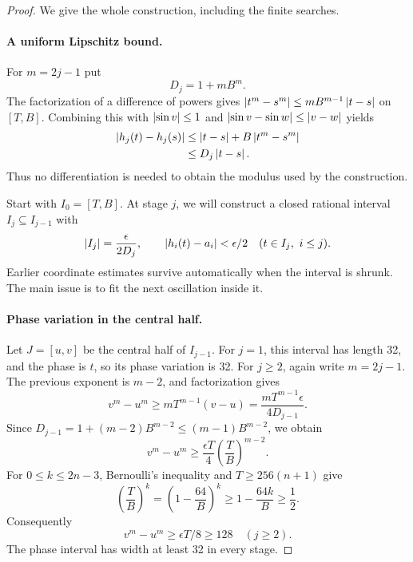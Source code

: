\begin{proof}
We give the whole construction, including the finite searches.

\paragraph{A uniform Lipschitz bound.}
For $m=2j-1$ put
\[
 D_j=1+mB^m.
\]
The factorization of a difference of powers gives
$\left|t^m-s^m\right|\le mB^{m-1}\left|t-s\right|$ on $[T,B]$. Combining this with
$\left|\sin v\right|\le1$ and
$\left|\sin v-\sin w\right|\le\left|v-w\right|$ yields
\begin{align}
 \left|h_j(t)-h_j(s)\right|
 &\le\left|t-s\right|+B\left|t^m-s^m\right|\notag\\
 &\le D_j\left|t-s\right|.\label{eq:density-lipschitz}
\end{align}
Thus no differentiation is needed to obtain the modulus used by the
construction.

Start with $I_0=[T,B]$. At stage $j$, we will construct a closed rational
interval $I_j\subseteq I_{j-1}$ with
\begin{equation}
 \left|I_j\right|=\frac\epsilon{2D_j},
 \qquad
 \left|h_i(t)-a_i\right|<\epsilon/2
 \quad(t\in I_j,\ i\le j).\label{eq:interval-invariant}
\end{equation}
Earlier coordinate estimates survive automatically when the interval is
shrunk. The main issue is to fit the next oscillation inside it.

\paragraph{Phase variation in the central half.}
Let $J=[u,v]$ be the central half of $I_{j-1}$. For $j=1$, this interval
has length 32, and the phase is $t$, so its phase variation is 32.
For $j\ge2$, again write $m=2j-1$. The previous exponent is $m-2$,
and factorization gives
\[
 v^m-u^m\ge mT^{m-1}(v-u)
 =\frac{mT^{m-1}\epsilon}{4D_{j-1}}.
\]
Since
$D_{j-1}=1+(m-2)B^{m-2}\le(m-1)B^{m-2}$, we obtain
\[
 v^m-u^m
 \ge\frac{\epsilon T}{4}
       \left(\frac TB\right)^{m-2}.
\]
For $0\le k\le2n-3$, Bernoulli's inequality and
$T\ge256(n+1)$ give
\[
 \left(\frac TB\right)^k
 =\left(1-\frac{64}{B}\right)^k
 \ge1-\frac{64k}{B}\ge\frac12.
\]
Consequently
\begin{equation}
 v^m-u^m\ge\epsilon T/8\ge128
 \quad(j\ge2).\label{eq:phase-room}
\end{equation}
The phase interval has width at least 32 in every stage.


\end{proof}
